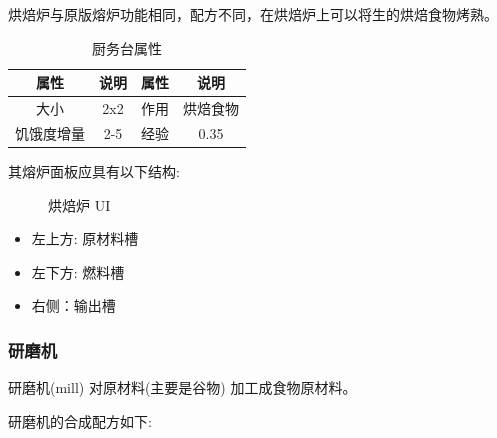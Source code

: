 烘焙炉与原版熔炉功能相同，配方不同，在烘焙炉上可以将生的烘焙食物烤熟。

\begin{table}[H]
    \centering
    \caption{厨务台属性}
    \setlength{\tabcolsep}{4mm}
    \begin{tabular}{c|cc|c}
        \toprule
        \textbf{属性} & \textbf{说明} & \textbf{属性} & \textbf{说明} \\
        \midrule
        大小 & 2x2 & 作用 & 烘焙食物 \\
        饥饿度增量 & 2-5 & 经验 & 0.35 \\
        \bottomrule
    \end{tabular}
\end{table}

其熔炉面板应具有以下结构:

\begin{figure}[H]
    \centering
    \caption{烘焙炉 UI}
\end{figure}

\begin{itemize}
    \item 左上方: 原材料槽
    \item 左下方: 燃料槽
    \item 右侧：输出槽
\end{itemize}

\subsubsection{研磨机}

研磨机(mill) 对原材料(主要是谷物) 加工成食物原材料。

研磨机的合成配方如下:


